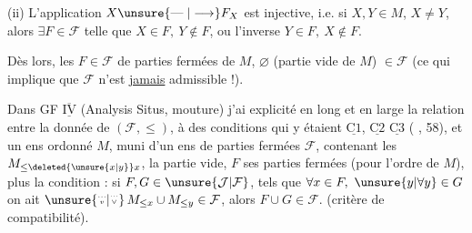 (ii) L'application $X\unsure{\mathrel{\text{---}}|\longrightarrow} F_{X}$ est injective, i.e. si $X,Y\in M$, $X\ne Y$, alors $\exists F\in\mathcal{F}$ telle que $X\in F,\ Y\notin F$, ou l'inverse $Y\in F,\ X\notin F$.

Dès lors, les $F\in\mathcal{F}$   de parties fermées de $M$,    $\varnothing$ (partie vide de $M$) $\in\mathcal{F}$ (ce qui implique que $\mathcal{F}$ n'est \uline{jamais} admissible !).

Dans GF $\overline{\underline{\mathrm{IV}}}$ (Analysis Situs,  mouture) j'ai explicité en long et en large la relation entre la donnée de $(\mathcal{F},\leq)$,  à des conditions qui y étaient  $\underline{\mathrm{C1}}$, $\underline{\mathrm{C2}}$ $\underline{\mathrm{C3}}$ (  , 58),
 et un ens ordonné $M$, muni d'un ens de parties fermées $\mathcal{F}$, contenant les $M_{\leq \deleted{\unsure{x|y}}x}$, la partie vide,    $F$ ses parties fermées (pour l'ordre de $M$), plus la condition : si $F,G\in\unsure{\mathcal{J}|\mathcal{F}}$, tels que $\forall x\in F,\ \unsure{y|\forall y}\in G$ on ait $\unsure{\overset{\scriptscriptstyle\cdots}{\scriptscriptstyle v}|\overset{\scriptscriptstyle\cdots}{\scriptscriptstyle\vee}}\,M_{\leq x}\cup M_{\leq y}\in\mathcal{F}$, alors $F\cup G\in\mathcal{F}$. (critère de compatibilité).

